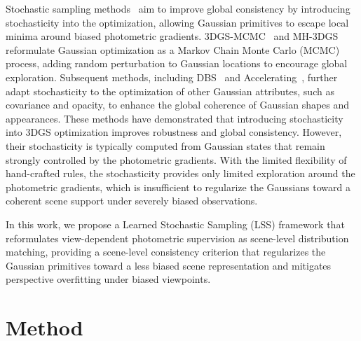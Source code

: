 \documentclass[lettersize,journal]{IEEEtran}
\begin{document}
Stochastic sampling methods~\cite{accelerating,mcmc,beta,mh3dgs} aim to improve global consistency by introducing stochasticity into the optimization, allowing Gaussian primitives to escape local minima around biased photometric gradients. 
3DGS-MCMC~\cite{mcmc} and MH-3DGS~\cite{mh3dgs} reformulate Gaussian optimization as a Markov Chain Monte Carlo (MCMC) process, adding random perturbation to Gaussian locations to encourage global exploration.
Subsequent methods, including DBS~\cite{beta} and Accelerating~\cite{accelerating}, further adapt stochasticity to the optimization of other Gaussian attributes, such as covariance and opacity, to enhance the global coherence of Gaussian shapes and appearances. These methods have demonstrated that introducing stochasticity into 3DGS optimization improves robustness and global consistency. 
However, their stochasticity is typically computed from Gaussian states that remain strongly controlled by the photometric gradients. With the limited flexibility of hand-crafted rules, the stochasticity provides only limited exploration around the photometric gradients,
which is insufficient to regularize the Gaussians toward a coherent scene support under severely biased observations.

In this work, we propose a Learned Stochastic Sampling (LSS) framework that reformulates view-dependent photometric supervision as scene-level distribution matching, 
providing a scene-level consistency criterion that regularizes the Gaussian primitives toward a less biased scene representation and mitigates perspective overfitting under biased viewpoints.


\section{Method}
\end{document}
